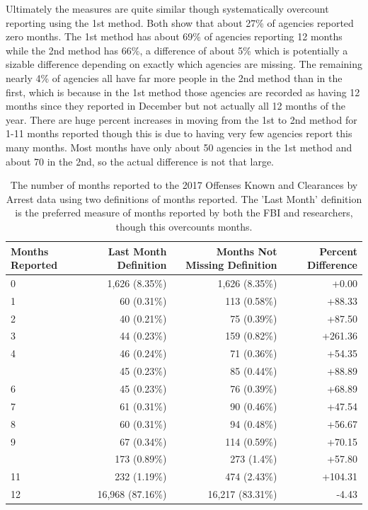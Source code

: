 \documentclass[
  12pt,
  openany]{book}
\begin{document}
Ultimately the measures are quite similar though systematically overcount reporting using the 1st method. Both show that about 27\% of agencies reported zero months. The 1st method has about 69\% of agencies reporting 12 months while the 2nd method has 66\%, a difference of about 5\% which is potentially a sizable difference depending on exactly which agencies are missing. The remaining nearly 4\% of agencies all have far more people in the 2nd method than in the first, which is because in the 1st method those agencies are recorded as having 12 months since they reported in December but not actually all 12 months of the year. There are huge percent increases in moving from the 1st to 2nd method for 1-11 months reported though this is due to having very few agencies report this many months. Most months have only about 50 agencies in the 1st method and about 70 in the 2nd, so the actual difference is not that large.

\begin{longtable}[t]{lrrr}
\caption{\label{tab:countyMonthsReportedDefinitions}The number of months reported to the 2017 Offenses Known and Clearances by Arrest data using two definitions of months reported. The 'Last Month' definition is the preferred measure of months reported by both the FBI and researchers, though this overcounts months.}\\
\toprule
Months Reported & Last Month Definition & Months Not Missing Definition & Percent Difference\\
\midrule
0 & 1,626 (8.35\%) & 1,626 (8.35\%) & +0.00\\
1 & 60 (0.31\%) & 113 (0.58\%) & +88.33\\
2 & 40 (0.21\%) & 75 (0.39\%) & +87.50\\
3 & 44 (0.23\%) & 159 (0.82\%) & +261.36\\
4 & 46 (0.24\%) & 71 (0.36\%) & +54.35\\
\addlinespace
5 & 45 (0.23\%) & 85 (0.44\%) & +88.89\\
6 & 45 (0.23\%) & 76 (0.39\%) & +68.89\\
7 & 61 (0.31\%) & 90 (0.46\%) & +47.54\\
8 & 60 (0.31\%) & 94 (0.48\%) & +56.67\\
9 & 67 (0.34\%) & 114 (0.59\%) & +70.15\\
\addlinespace
10 & 173 (0.89\%) & 273 (1.4\%) & +57.80\\
11 & 232 (1.19\%) & 474 (2.43\%) & +104.31\\
12 & 16,968 (87.16\%) & 16,217 (83.31\%) & -4.43\\
\bottomrule
\end{longtable}
\end{document}
